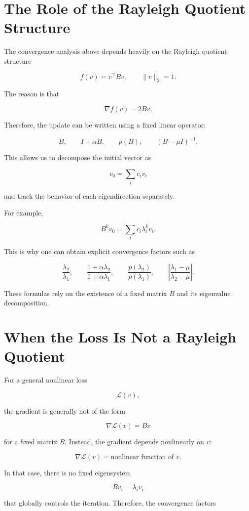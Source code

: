 \documentclass{article}
\begin{document}
\section{The Role of the Rayleigh Quotient Structure}

The convergence analysis above depends heavily on the Rayleigh quotient structure

\[
f(v)=v^\top Bv,
\qquad \|v\|_2=1.
\]

The reason is that

\[
\nabla f(v)=2Bv.
\]

Therefore, the update can be written using a fixed linear operator:

\[
B,
\qquad
I+\alpha B,
\qquad
p(B),
\qquad
(B-\mu I)^{-1}.
\]

This allows us to decompose the initial vector as

\[
v_0=\sum_i c_i v_i
\]

and track the behavior of each eigendirection separately.

For example,

\[
B^k v_0
=
\sum_i c_i\lambda_i^k v_i.
\]

This is why one can obtain explicit convergence factors such as

\[
\frac{\lambda_2}{\lambda_1},
\qquad
\frac{1+\alpha\lambda_2}{1+\alpha\lambda_1},
\qquad
\frac{p(\lambda_2)}{p(\lambda_1)},
\qquad
\left|
\frac{\lambda_1-\mu}{\lambda_2-\mu}
\right|.
\]

These formulas rely on the existence of a fixed matrix \(B\) and its eigenvalue decomposition.

\section{When the Loss Is Not a Rayleigh Quotient}

For a general nonlinear loss

\[
\mathcal{L}(v),
\]

the gradient is generally not of the form

\[
\nabla \mathcal{L}(v)=Bv
\]

for a fixed matrix \(B\). Instead, the gradient depends nonlinearly on \(v\):

\[
\nabla \mathcal{L}(v)
=
\text{nonlinear function of }v.
\]

In that case, there is no fixed eigensystem

\[
Bv_i=\lambda_i v_i
\]

that globally controls the iteration. Therefore, the convergence factors
\end{document}
